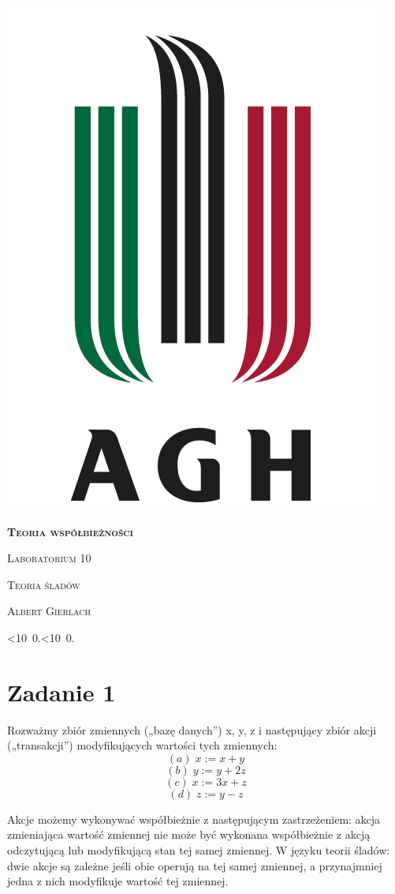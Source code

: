 \documentclass[12pt]{article}
\def\mydate{\leavevmode\hbox{\twodigits\day.\twodigits\month.\the\year}}
\def\twodigits#1{\ifnum#1<10 0\fi\the#1}
\begin{document}
\thispagestyle{empty}
\begin{center}
\begin{minipage}{0.75\linewidth}
    \centering
    \includegraphics[width=0.45\linewidth]{agh_logo2.png}
    \par
    \vspace{2cm}
    {\bfseries{\scshape{\Huge  Teoria współbieżności}}}
    \par
    \vspace{1.7cm}
    {\scshape{\Large Laboratorium 10}}
    \par
    \vspace{0.8cm}
    {\scshape{\Large Teoria śladów}}
    \par
    \vspace{3cm}

    {\scshape{\Large Albert Gierlach}}\par
    \vspace{1cm}

    {\Large \mydate}
\end{minipage}
\end{center}
\clearpage



\section{Zadanie 1}
Rozważmy zbiór zmiennych („bazę danych”) {x, y, z} i następujący zbiór akcji („transakcji”) modyfikujących wartości tych zmiennych:
\[ (a)\;x := x + y \]
\[ (b)\;y := y + 2z \]
\[ (c)\;x := 3x + z \]
\[ (d)\;z := y - z \]

Akcje możemy wykonywać współbieżnie z następującym zastrzeżeniem: akcja zmieniająca wartość zmiennej nie może być wykonana współbieżnie z akcją odczytującą lub modyfikującą stan tej samej zmiennej. W języku teorii śladów: dwie akcje są zależne jeśli obie operują na tej samej zmiennej, a przynajmniej jedna z nich modyfikuje wartość tej zmiennej.
 
\end{document}
